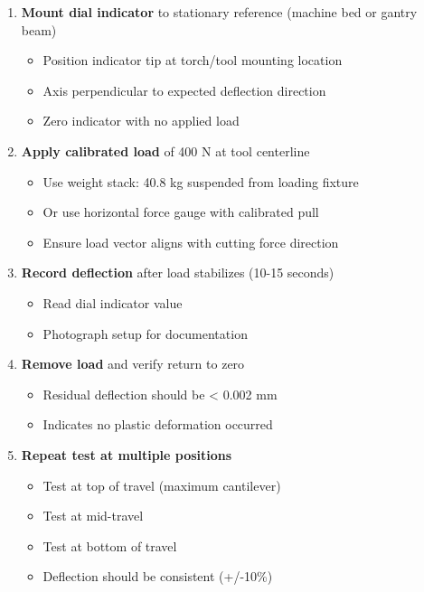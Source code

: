 \documentclass[
]{article}
\providecommand{\tightlist}{%
  \setlength{\itemsep}{0pt}\setlength{\parskip}{0pt}}
\begin{document}
\begin{enumerate}
\def\labelenumi{\arabic{enumi}.}
\tightlist
\item
  \textbf{Mount dial indicator} to stationary reference (machine bed or
  gantry beam)

  \begin{itemize}
  \tightlist
  \item
    Position indicator tip at torch/tool mounting location
  \item
    Axis perpendicular to expected deflection direction
  \item
    Zero indicator with no applied load
  \end{itemize}
\item
  \textbf{Apply calibrated load} of 400 N at tool centerline

  \begin{itemize}
  \tightlist
  \item
    Use weight stack: 40.8 kg suspended from loading fixture
  \item
    Or use horizontal force gauge with calibrated pull
  \item
    Ensure load vector aligns with cutting force direction
  \end{itemize}
\item
  \textbf{Record deflection} after load stabilizes (10-15 seconds)

  \begin{itemize}
  \tightlist
  \item
    Read dial indicator value
  \item
    Photograph setup for documentation
  \end{itemize}
\item
  \textbf{Remove load} and verify return to zero

  \begin{itemize}
  \tightlist
  \item
    Residual deflection should be \textless{} 0.002 mm
  \item
    Indicates no plastic deformation occurred
  \end{itemize}
\item
  \textbf{Repeat test at multiple positions}

  \begin{itemize}
  \tightlist
  \item
    Test at top of travel (maximum cantilever)
  \item
    Test at mid-travel
  \item
    Test at bottom of travel
  \item
    Deflection should be consistent (+/-10\%)
  \end{itemize}
\end{enumerate}
\end{document}
